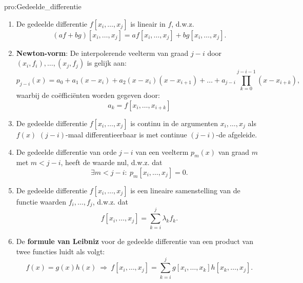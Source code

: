 \begin{pro}{pro:Gedeelde_differentie}
    \begin{enumerate}
        \item 
            De gedeelde differentie $f[x_i,\ldots,x_j]$ is lineair in $f$, d\@.w\@.z\@.
            \begin{equation*}
                (af + bg)[x_i,\ldots,x_j] = a f[x_i,\ldots,x_j] + b g[x_i,\ldots,x_j].
            \end{equation*}
        \item
            \textbf{Newton-vorm}: De interpolerende veelterm van graad $j-i$ door $(x_i,f_i), \ldots, (x_j,f_j)$ is gelijk aan:
            \begin{equation*}
                p_{j-i}(x) = a_0 + a_1(x-x_i) + a_2(x-x_i)(x-x_{i+1}) + \ldots + a_{j-i}\prod_{k=0}^{j-i-1}(x-x_{i+k}),
            \end{equation*}
            waarbij de coëfficiënten worden gegeven door:
            \begin{equation*}
                a_k = f[x_i,\ldots,x_{i+k}]
            \end{equation*}
        \item 
            De gedeelde differentie $f[x_i,\ldots,x_j]$ is continu in de argumenten $x_i,\ldots,x_j$ als $f(x)$ $(j-i)$-maal differentieerbaar is met continue $(j-i)$-de afgeleide.
        \item 
            De gedeelde differentie van orde $j-i$ van een veelterm $p_m(x)$ van graad $m$ met $m < j -i$, heeft de waarde nul, d\@.w\@.z\@. dat
            \begin{equation*}
                \exists m < j -i:\ p_m[x_i,\ldots,x_j] = 0.
            \end{equation*}
        \item 
            De gedeelde differentie $f[x_i,\ldots,x_j]$ is een lineaire samenstelling van de functie waarden $f_i,\ldots,f_j$, d\@.w\@.z\@. dat
            \begin{equation*}
                f[x_i,\ldots,x_j] = \sum_{k=i}^{j} \lambda_k f_k.
            \end{equation*}
        \item 
            De \textbf{formule van Leibniz} voor de gedeelde differentie van een product van twee functies luidt als volgt:
            \begin{equation*}
                f(x) = g(x)h(x) \ \Rightarrow \ f[x_i,\ldots,x_j] = \sum_{k=i}^{j} g[x_i,\ldots,x_k]h[x_k,\ldots,x_j].
            \end{equation*}
    \end{enumerate}
\end{pro}

